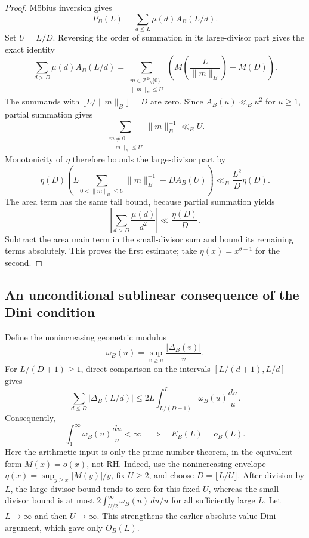 \documentclass[11pt,a4paper]{article}
\numberwithin{equation}{section}
\theoremstyle{definition}
\theoremstyle{remark}
\begin{document}
\begin{proof}
M\"obius inversion gives
\[
 P_B(L)=\sum_{d\le L}\mu(d)A_B(L/d).
\]
Set $U=L/D$.  Reversing the order of summation in its large-divisor
part gives the exact identity
\[
 \sum_{d>D}\mu(d)A_B(L/d)
   =\sum_{\substack{m\in\mathbb Z^2\setminus\{0\}\\\|m\|_B\le U}}
       \left(M\!\left(\frac{L}{\|m\|_B}\right)-M(D)\right).
\]
The summands with $\lfloor L/\|m\|_B\rfloor=D$ are zero.
Since $A_B(u)\ll_B u^2$ for $u\ge1$, partial summation gives
\[
 \sum_{\substack{m\ne0\\\|m\|_B\le U}}\|m\|_B^{-1}\ll_B U.
\]
Monotonicity of $\eta$ therefore bounds the large-divisor part by
\[
 \eta(D)\left(L\sum_{0<\|m\|_B\le U}\|m\|_B^{-1}
                      +D A_B(U)\right)
       \ll_B\frac{L^2}{D}\eta(D).
\]
The area term has the same tail bound, because partial summation yields
\[
 \left|\sum_{d>D}\frac{\mu(d)}{d^2}\right|
       \ll\frac{\eta(D)}{D}.
\]
Subtract the area main term in the small-divisor sum and bound its
remaining terms absolutely.  This proves the first estimate; take
$\eta(x)=x^{\theta-1}$ for the second.
\end{proof}

\subsection{An unconditional sublinear consequence of the Dini condition}
Define the nonincreasing geometric modulus
\[
 \omega_B(u)=\sup_{v\ge u}\frac{|\Delta_B(v)|}{v}.
\]
For $L/(D+1)\ge1$, direct comparison on the intervals
$[L/(d+1),L/d]$ gives
\begin{equation}\label{eq:primitiveRHmodulus}
 \sum_{d\le D}|\Delta_B(L/d)|
   \le 2L\int_{L/(D+1)}^L\omega_B(u)\frac{du}{u}.
\end{equation}
Consequently,
\begin{equation}\label{eq:primitiveDiniPNT}
 \int_1^\infty\omega_B(u)\frac{du}{u}<\infty
 \quad\Longrightarrow\quad E_B(L)=o_B(L).
\end{equation}
Here the arithmetic input is only the prime number theorem, in the
equivalent form $M(x)=o(x)$, not RH.  Indeed, use the nonincreasing
envelope $\eta(x)=\sup_{y\ge x}|M(y)|/y$, fix $U\ge2$, and choose
$D=\lfloor L/U\rfloor$.  After division by $L$, the large-divisor
bound tends to zero for this fixed $U$, whereas the small-divisor bound
is at most
$2\int_{U/2}^{\infty}\omega_B(u)\,du/u$ for all sufficiently large $L$.
Let $L\to\infty$ and then $U\to\infty$.
This strengthens the earlier absolute-value Dini argument, which gave
only $O_B(L)$.
\end{document}
